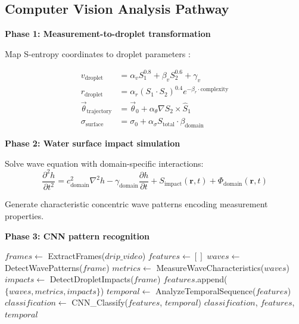 \documentclass[12pt,a4paper]{article}
\begin{document}
\subsection{Computer Vision Analysis Pathway}

\textbf{Phase 1: Measurement-to-droplet transformation}

Map S-entropy coordinates to droplet parameters \cite{sachikonye2024molecule_to_drip}:

\begin{align}
v_{\text{droplet}} &= \alpha_v S_1^{0.8} + \beta_v S_2^{0.6} + \gamma_v \\
r_{\text{droplet}} &= \alpha_r (S_1 \cdot S_2)^{0.4} e^{-\beta_r \cdot \text{complexity}} \\
\vec{\theta}_{\text{trajectory}} &= \vec{\theta}_0 + \alpha_\theta \nabla S_2 \times \hat{S}_1 \\
\sigma_{\text{surface}} &= \sigma_0 + \alpha_\sigma S_{\text{total}} \cdot \beta_{\text{domain}}
\end{align}

\textbf{Phase 2: Water surface impact simulation}

Solve wave equation with domain-specific interactions:
\begin{equation}
\frac{\partial^2 h}{\partial t^2} = c_{\text{domain}}^2 \nabla^2 h - \gamma_{\text{domain}} \frac{\partial h}{\partial t} + S_{\text{impact}}(\mathbf{r}, t) + \Phi_{\text{domain}}(\mathbf{r}, t)
\end{equation}

Generate characteristic concentric wave patterns encoding measurement properties.

\textbf{Phase 3: CNN pattern recognition}

\begin{algorithm}
\caption{Computer Vision Measurement Analysis}
\begin{algorithmic}[1]
    \State $frames \gets$ ExtractFrames($drip\_video$)
    \State $features \gets []$
        \State $waves \gets$ DetectWavePatterns($frame$)
        \State $metrics \gets$ MeasureWaveCharacteristics($waves$)
        \State $impacts \gets$ DetectDropletImpacts($frame$)
        \State $features$.append($\{waves, metrics, impacts\}$)
    \EndFor
    \State $temporal \gets$ AnalyzeTemporalSequence($features$)
    \State $classification \gets$ CNN\_Classify($features$, $temporal$)
    \State \Return $classification$, $features$, $temporal$
\EndProcedure
\end{algorithmic}
\end{algorithm}
\end{document}
